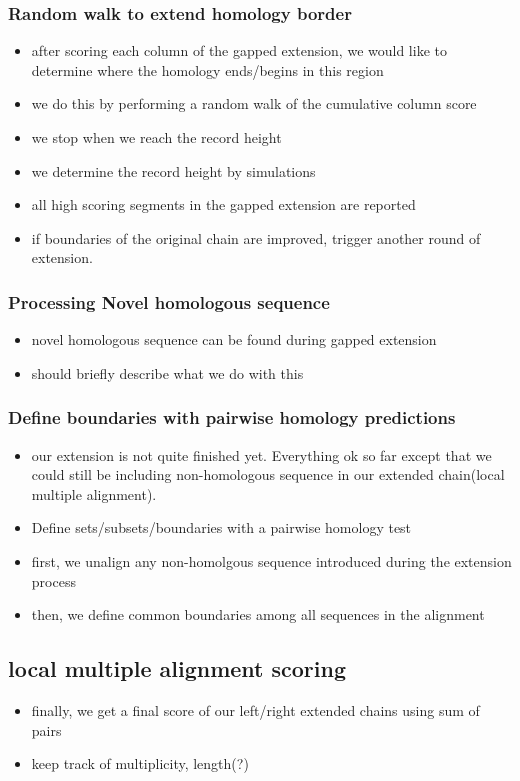 \documentclass{llncs}
\begin{document}
\subsubsection{Random walk to extend homology border}

\begin{itemize}
\item after scoring each column of the gapped extension, we would like
to determine where the homology ends/begins in this region
\item we do this by performing a random walk of the cumulative column score
\item we stop when we reach the record height
\item we determine the record height by simulations
\item all high scoring segments in the gapped extension are reported
\item if boundaries of the original chain are improved, trigger another round of extension.
\end{itemize}

\subsubsection{Processing Novel homologous sequence}
\begin{itemize}
\item novel homologous sequence can be found during gapped extension
\item should briefly describe what we do with this
\end{itemize}
\subsubsection{Define boundaries with pairwise homology predictions}
\begin{itemize}
\item our extension is not quite finished yet. Everything ok so far except that we could
still be including non-homologous sequence in our extended chain(local multiple alignment).
\item Define sets/subsets/boundaries with a pairwise homology test
\item first, we unalign any non-homolgous sequence introduced during the extension process
\item then, we define common boundaries among all sequences in the alignment
\end{itemize}
\subsection{local multiple alignment scoring}
\begin{itemize}
\item finally, we get a final score of our left/right extended chains using sum of pairs
\item keep track of multiplicity, length(?)
\end{itemize}
\end{document}
